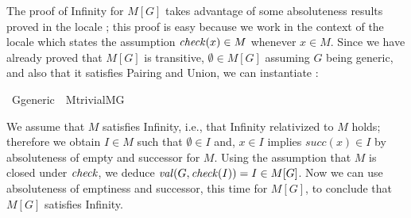 The proof of Infinity for $M[G]$ takes advantage of some absoluteness
results proved in the locale ; this
proof is easy because we work in the context of the locale
 which states
the assumption $\operatorname{\mathit{check}}(x) \in M$ whenever $x\in M$. Since we have
already proved that $M[G]$ is transitive, $\emptyset\in M[G]$ assuming
$G$ being generic, and also that it satisfies Pairing and Union, we
can instantiate :
\begin{isabelle}
\isamarkupfalse%
\ G{\isacharunderscore}generic\ {\isasymsubseteq}\ M{\isacharunderscore}trivial{\isachardoublequoteopen}{\isacharhash}{\isacharhash}M{\isacharbrackleft}G{\isacharbrackright}{\isachardoublequoteclose}
\end{isabelle}
We assume that $M$ satisfies Infinity, i.e., that Infinity relativized
to $M$ holds; therefore we obtain $I \in M$ such that $\emptyset\in I$
and, $x \in I$ implies $\mathit{succ}(x)\in I$ by absoluteness of
empty and successor for $M$. Using the assumption that $M$ is closed
under $\operatorname{\mathit{check}}$, we deduce $\operatorname{\mathit{val}}(G,\operatorname{\mathit{check}}(I)) = I \in M[G]$.  Now we can
use absoluteness of emptiness and successor, this time for $M[G]$, to
conclude that $M[G]$ satisfies Infinity.

